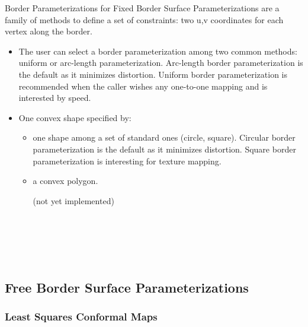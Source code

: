 Border Parameterizations for Fixed Border Surface Parameterizations
are a family of methods to define a
set of constraints: two u,v coordinates for each vertex along the border.

\begin{itemize}

\item The user can select a border parameterization among
two common methods: uniform or arc-length parameterization.
Arc-length border parameterization is the default as it minimizes distortion.
Uniform border parameterization is recommended when the caller wishes
any one-to-one mapping and is interested by speed.

\item One convex shape specified by:

    \begin{itemize}

    \item one shape among a set of standard ones (circle, square).
    Circular border parameterization is the default as it minimizes distortion.
    Square border parameterization is interesting for texture mapping.

    \item a convex polygon.

    (not yet implemented)

    \end{itemize}

\end{itemize}

  \\
  \\
  \\
  \\


\subsection{Free Border Surface Parameterizations}

\subsubsection{Least Squares Conformal Maps}

  \\

